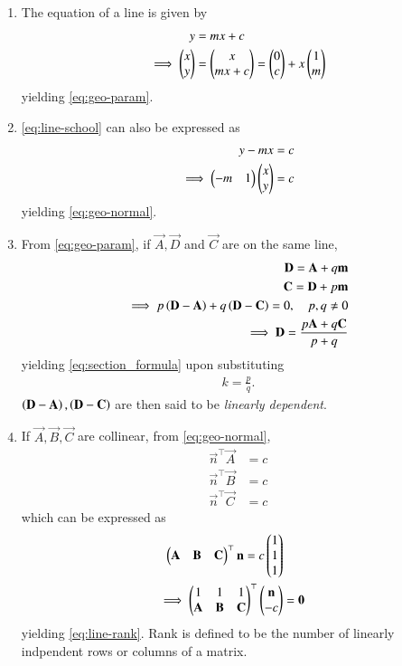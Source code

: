 \begin{enumerate}[label=\thesection.\arabic*.,ref=\thesection.\theenumi]
\item The equation of a line is given by 
\begin{align}
			\label{eq:line-school}
	y &= mx + c
	\\
	\implies \begin{pmatrix}x \\ y\end{pmatrix} &= \begin{pmatrix}x \\ 
	 mx + c\end{pmatrix} =\begin{pmatrix}0 \\ c\end{pmatrix} + x\begin{pmatrix}1 \\ m\end{pmatrix}
\end{align}
			yielding \eqref{eq:geo-param}.
\item 			\eqref{eq:line-school} can also be expressed as
\begin{align}
	y - mx &= c 
	\\
	\implies \begin{pmatrix}-m & 1\end{pmatrix}\begin{pmatrix}x \\ y\end{pmatrix} &= c
\end{align}
			yielding \eqref{eq:geo-normal}.
  \item From \eqref{eq:geo-param}, 
	  if $\vec{A},\vec{D}$ and $\vec{C}$ are on the same line,
		\label{prop:lin-dep}
\begin{align}
			\mathbf{D}=\mathbf{A}+q\mathbf{m} 
			\\ 
			\mathbf{C}=\mathbf{D}+p\mathbf{m} \\
			\label{eq:collinear} 
			\implies 	p\left(\mathbf{D}-\mathbf{A}\right) 
			+ q\left(\mathbf{D}-\mathbf{C}\right) = 0, \quad p, q \ne 0 \\ 
			\implies \mathbf{D} = \frac{p\mathbf{A}+q\mathbf{C}}{p+q} 
			\end{align} 
			yielding \eqref{eq:section_formula} upon substituting \begin{align} k = \frac{p}{q}. \end{align} 
			$\left(\mathbf{D}-\mathbf{A}\right), \left(\mathbf{D}-\mathbf{C}\right)$ 
		are then said to be {\em linearly dependent}.
	\item If $\vec{A}, \vec{B}, \vec{C}$ are collinear,  from \eqref{eq:geo-normal}, \begin{align}
	 \vec{n}^{\top}\vec{A} &=  c 
	 \\
	 \vec{n}^{\top}\vec{B} &=  c 
	 \\
	 \vec{n}^{\top}\vec{C} &=  c 
\end{align}
which can be expressed as 
\begin{align}
	\begin{pmatrix} \mathbf{A} & \mathbf{B} & \mathbf{C}\end{pmatrix}^{\top}\mathbf{n} = c\begin{pmatrix}1 \\ 1 \\ 1\end{pmatrix}
	\\
	\implies 
	\begin{pmatrix} 1 & 1 &1 \\ \mathbf{A} & \mathbf{B} & \mathbf{C}\end{pmatrix}^{\top}\begin{pmatrix}\mathbf{n} \\ -c\end{pmatrix} &= \mathbf{0}
		\label{prop:lin-dep-rank}
\end{align}
yielding
			\eqref{eq:line-rank}.  Rank is defined to be the number of linearly indpendent rows or columns of a matrix.


\end{enumerate}
